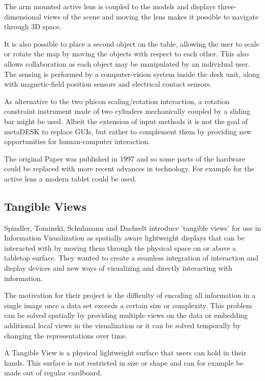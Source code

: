 The arm mounted active lens is coupled to the models and displays three-dimensional views of the scene and moving the lens makes it possible to navigate through 3D space. 

It is also possible to place a second object on the table, allowing the user to scale or rotate the map by moving the objects with respect to each other. This also allows collaboration as each object may be manipulated by an individual user. The sensing is performed by a computer-vision system inside the desk unit, along with magnetic-field position sensors and electrical contact sensors.

As alternative to the two phicon scaling/rotation interaction, a rotation constraint instrument made of two cylinders mechanically coupled by a sliding bar might be used.
Albeit the extension of input methods it is not the goal of metaDESK to replace GUIs, but rather to complement them by providing new opportunities for human-computer interaction. 

The original Paper was published in 1997 and so some parts of the hardware could be replaced with more recent advances in technology. For example for the active lens a modern tablet could be used. 




\subsection{Tangible Views}
Spindler, Tominski, Schuhmann and Dachselt \cite{spindler10} introduce 'tangible views' for use in Information Visualization as spatially aware lightweight displays that can be interacted with by moving them through the physical space on or above a tabletop surface. They wanted to create a seamless integration of interaction and display devices and new ways of visualizing and directly interacting with information. 

The motivation for their project is the difficulty of encoding all information in a single image once a data set exceeds a certain size or complexity. This problem can be solved spatially by providing multiple views on the data or embedding additional local views in the visualization or it can be solved temporally by changing the representations over time.

A Tangible View is a physical lightweight surface that users can hold in their hands. This surface is not restricted in size or shape and can for example be made out of regular cardboard. 

